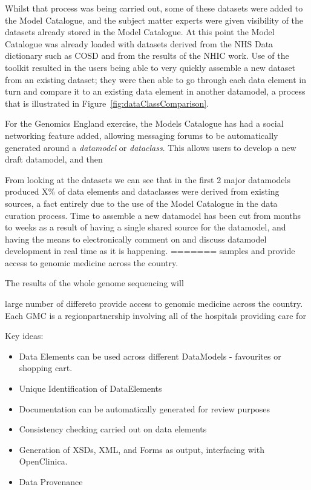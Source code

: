 Whilst that process was being carried out, some of these datasets were
added to the Model Catalogue, and the subject matter experts were
given visibility of the datasets already stored in the Model
Catalogue. At this point the Model Catalogue was already loaded with
datasets derived from the NHS Data dictionary such as COSD and from
the results of the NHIC work. Use of the toolkit resulted in the users
being able to very quickly assemble a new dataset from an existing
dataset; they were then able to go through each data element in turn
and compare it to an existing data element in another datamodel, a
process that is illustrated in Figure~\ref{fig:dataClassComparison}.

For the Genomics England exercise, the Models Catalogue has had a
social networking feature added, allowing messaging forums to be
automatically generated around a \emph{datamodel} or
\emph{dataclass}. This allows users to develop a new draft datamodel,
and then

From looking at the datasets we can see that in the first 2 major
datamodels produced X\% of data elements and dataclasses were derived
from existing sources, a fact entirely due to the use of the Model
Catalogue in the data curation process. Time to assemble a new
datamodel has been cut from months to weeks as a result of having a
single shared source for the datamodel, and having the means to
electronically comment on and discuss datamodel development in real
time as it is happening.
=======
samples and provide access to genomic medicine across the country.

The results of the whole genome sequencing will 


large number of differeto
provide access to genomic medicine across the country.  Each GMC is a
regionpartnership involving all of the hospitals providing care for



Key ideas:

\begin{itemize}
	\item Data Elements can be used across different DataModels - favourites or shopping cart.
	\item Unique Identification of DataElements 
	\item Documentation can be automatically generated for review purposes
	\item Consistency checking carried out on data elements
	\item Generation of XSDs, XML, and Forms as output, interfacing with OpenClinica.
	\item Data Provenance
\end{itemize}


